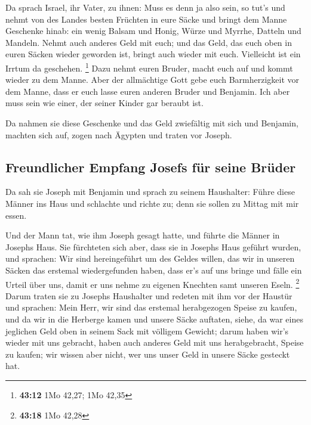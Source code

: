  Da sprach Israel, ihr Vater, zu ihnen: Muss es denn ja
also sein, so tut's und nehmt von des Landes besten Früchten in eure
Säcke und bringt dem Manne Geschenke hinab: ein wenig Balsam und Honig,
Würze und Myrrhe, Datteln und Mandeln.  Nehmt auch
anderes Geld mit euch; und das Geld, das euch oben in euren Säcken
wieder geworden ist, bringt auch wieder mit euch. Vielleicht ist ein
Irrtum da geschehen. \footnote{\textbf{43:12} 1Mo 42,27; 1Mo 42,35}
 Dazu nehmt euren Bruder, macht euch auf und kommt wieder
zu dem Manne.  Aber der allmächtige Gott gebe euch
Barmherzigkeit vor dem Manne, dass er euch lasse euren anderen Bruder
und Benjamin. Ich aber muss sein wie einer, der seiner Kinder gar
beraubt ist.

 Da nahmen sie diese Geschenke und das Geld zwiefältig
mit sich und Benjamin, machten sich auf, zogen nach Ägypten und traten
vor Joseph.

\hypertarget{freundlicher-empfang-josefs-fuxfcr-seine-bruxfcder}{%
\subsection{Freundlicher Empfang Josefs für seine
Brüder}\label{freundlicher-empfang-josefs-fuxfcr-seine-bruxfcder}}

 Da sah sie Joseph mit Benjamin und sprach zu seinem
Haushalter: Führe diese Männer ins Haus und schlachte und richte zu;
denn sie sollen zu Mittag mit mir essen.

 Und der Mann tat, wie ihm Joseph gesagt hatte, und
führte die Männer in Josephs Haus.  Sie fürchteten sich
aber, dass sie in Josephs Haus geführt wurden, und sprachen: Wir sind
hereingeführt um des Geldes willen, das wir in unseren Säcken das
erstemal wiedergefunden haben, dass er's auf uns bringe und fälle ein
Urteil über uns, damit er uns nehme zu eigenen Knechten samt unseren
Eseln. \footnote{\textbf{43:18} 1Mo 42,28}  Darum traten
sie zu Josephs Haushalter und redeten mit ihm vor der Haustür
 und sprachen: Mein Herr, wir sind das erstemal
herabgezogen Speise zu kaufen,  und da wir in die
Herberge kamen und unsere Säcke auftaten, siehe, da war eines jeglichen
Geld oben in seinem Sack mit völligem Gewicht; darum haben wir's wieder
mit uns gebracht,  haben auch anderes Geld mit uns
herabgebracht, Speise zu kaufen; wir wissen aber nicht, wer uns unser
Geld in unsere Säcke gesteckt hat.

